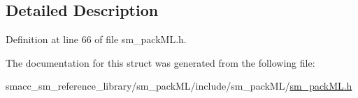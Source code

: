 \subsection{Detailed Description}


Definition at line 66 of file sm\+\_\+pack\+M\+L.\+h.



The documentation for this struct was generated from the following file\+:\begin{DoxyCompactItemize}
\item 
smacc\+\_\+sm\+\_\+reference\+\_\+library/sm\+\_\+pack\+M\+L/include/sm\+\_\+pack\+M\+L/\hyperlink{sm__packML_8h}{sm\+\_\+pack\+M\+L.\+h}\end{DoxyCompactItemize}
